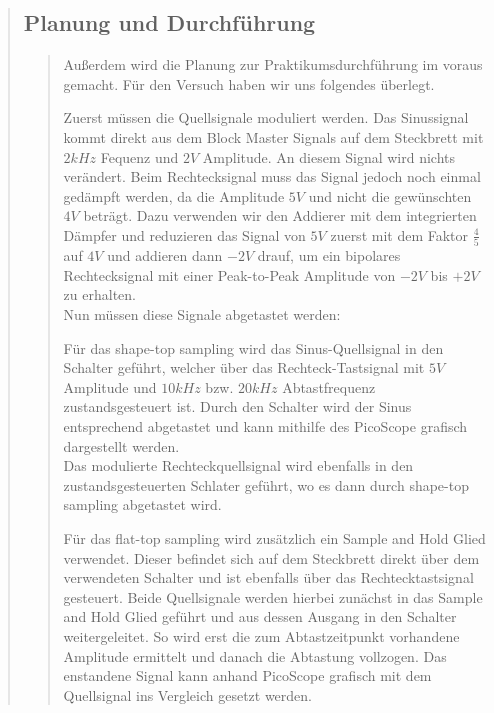 \begin{quote}
\begin{quote}
        
    \end{quote}  %
    
    \subsection{Planung und Durchführung}
    \begin{quote}
        Außerdem wird die Planung zur Praktikumsdurchführung im voraus gemacht. Für
        den Versuch haben wir uns folgendes überlegt.\\
        
        Zuerst müssen die Quellsignale moduliert werden. Das Sinussignal
        kommt direkt aus dem Block Master Signals auf dem Steckbrett mit $2 kHz$ Fequenz und
        $2V$ Amplitude. An diesem Signal wird nichts verändert. Beim
        Rechtecksignal muss das Signal jedoch noch einmal gedämpft werden, da die Amplitude $5V$ und nicht die
        gewünschten $4V$ beträgt.
        Dazu verwenden wir den Addierer mit dem integrierten Dämpfer und
        reduzieren das Signal von $5V$ zuerst mit dem Faktor $\frac{4}{5}$ auf $4V$ und addieren dann $-2V$ drauf, um
        ein bipolares Rechtecksignal mit einer Peak-to-Peak Amplitude von $-2V$
        bis $+2V$ zu erhalten.\\
        Nun müssen diese Signale abgetastet werden:
        
        Für das shape-top sampling wird das Sinus-Quellsignal in den
        Schalter geführt, welcher über das Rechteck-Tastsignal mit $5V$ Amplitude und $10 kHz$ bzw. $20 kHz$
        Abtastfrequenz zustandsgesteuert ist. Durch den Schalter wird der Sinus
        entsprechend abgetastet und kann mithilfe des PicoScope grafisch
        dargestellt werden.\\ 
        Das modulierte Rechteckquellsignal wird ebenfalls in den
        zustandsgesteuerten Schlater geführt, wo es dann durch shape-top sampling
        abgetastet wird. 
        
        \vspace{0.5em}
        
        Für das flat-top sampling wird zusätzlich ein Sample and Hold Glied
        verwendet. Dieser befindet sich auf dem Steckbrett direkt über dem
        verwendeten Schalter und ist ebenfalls über das Rechtecktastsignal
        gesteuert. Beide Quellsignale werden hierbei zunächst in das Sample and
        Hold Glied geführt und aus dessen Ausgang in den Schalter
        weitergeleitet. So wird erst die zum Abtastzeitpunkt vorhandene
        Amplitude ermittelt und danach die Abtastung vollzogen. Das enstandene
        Signal kann anhand PicoScope grafisch mit dem Quellsignal ins Vergleich gesetzt
        werden.
        

\end{quote}
\end{quote}
